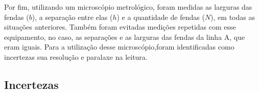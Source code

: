 Por fim, utilizando um microscópio metrológico, foram medidas as larguras das fendas ($b$), a separação entre elas ($h$) e a quantidade de fendas ($N$), em todas as situações anteriores. Também foram evitadas medições repetidas com esse equipamento, no caso, as separações e as larguras das fendas da linha A, que eram iguais. Para a utilização desse microscópio,foram identificadas como incertezas sua resolução e paralaxe na leitura.

\subsection{Incertezas}
    
